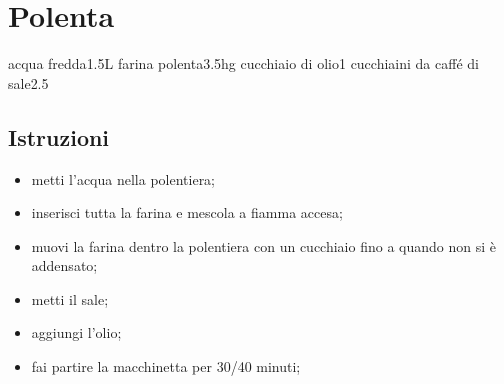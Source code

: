 \section{Polenta}

\generalRecipeInfos{}

\ingredienti%
    {acqua fredda}{1.5L}%
    {farina polenta}{3.5hg}%
    {cucchiaio di olio}{1}%
    {cucchiaini da caffé di sale}{2.5}%


\subsection{Istruzioni}

\begin{itemize}
    \item metti l'acqua nella polentiera;
    \item inserisci tutta la farina e mescola a fiamma accesa;
    \item muovi la farina dentro la polentiera con un cucchiaio fino a quando non si è addensato;
    \item metti il sale;
    \item aggiungi l'olio;
    \item fai partire la macchinetta per 30/40 minuti;
\end{itemize}